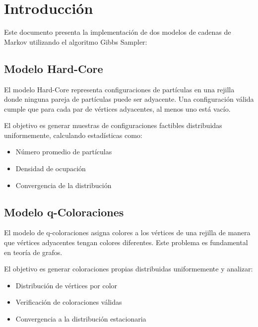 \section{Introducción}

Este documento presenta la implementación de dos modelos de cadenas de Markov utilizando el algoritmo Gibbs Sampler:

\subsection{Modelo Hard-Core}

El modelo Hard-Core representa configuraciones de partículas en una rejilla donde ninguna pareja de partículas puede ser adyacente. Una configuración válida cumple que para cada par de vértices adyacentes, al menos uno está vacío.

El objetivo es generar muestras de configuraciones factibles distribuidas uniformemente, calculando estadísticas como:
\begin{itemize}
\item Número promedio de partículas
\item Densidad de ocupación
\item Convergencia de la distribución
\end{itemize}

\subsection{Modelo q-Coloraciones}

El modelo de q-coloraciones asigna colores a los vértices de una rejilla de manera que vértices adyacentes tengan colores diferentes. Este problema es fundamental en teoría de grafos.

El objetivo es generar coloraciones propias distribuidas uniformemente y analizar:
\begin{itemize}
\item Distribución de vértices por color
\item Verificación de coloraciones válidas
\item Convergencia a la distribución estacionaria
\end{itemize}

